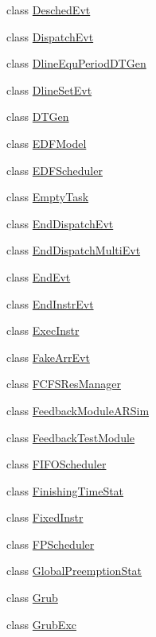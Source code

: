 \begin{DoxyCompactItemize}
class \hyperlink{classRTSim_1_1DeschedEvt}{Desched\+Evt}
\item 
class \hyperlink{classRTSim_1_1DispatchEvt}{Dispatch\+Evt}
\item 
class \hyperlink{classRTSim_1_1DlineEquPeriodDTGen}{Dline\+Equ\+Period\+D\+T\+Gen}
\item 
class \hyperlink{classRTSim_1_1DlineSetEvt}{Dline\+Set\+Evt}
\item 
class \hyperlink{classRTSim_1_1DTGen}{D\+T\+Gen}
\item 
class \hyperlink{classRTSim_1_1EDFModel}{E\+D\+F\+Model}
\item 
class \hyperlink{classRTSim_1_1EDFScheduler}{E\+D\+F\+Scheduler}
\item 
class \hyperlink{classRTSim_1_1EmptyTask}{Empty\+Task}
\item 
class \hyperlink{classRTSim_1_1EndDispatchEvt}{End\+Dispatch\+Evt}
\item 
class \hyperlink{classRTSim_1_1EndDispatchMultiEvt}{End\+Dispatch\+Multi\+Evt}
\item 
class \hyperlink{classRTSim_1_1EndEvt}{End\+Evt}
\item 
class \hyperlink{classRTSim_1_1EndInstrEvt}{End\+Instr\+Evt}
\item 
class \hyperlink{classRTSim_1_1ExecInstr}{Exec\+Instr}
\item 
class \hyperlink{classRTSim_1_1FakeArrEvt}{Fake\+Arr\+Evt}
\item 
class \hyperlink{classRTSim_1_1FCFSResManager}{F\+C\+F\+S\+Res\+Manager}
\item 
class \hyperlink{classRTSim_1_1FeedbackModuleARSim}{Feedback\+Module\+A\+R\+Sim}
\item 
class \hyperlink{classRTSim_1_1FeedbackTestModule}{Feedback\+Test\+Module}
\item 
class \hyperlink{classRTSim_1_1FIFOScheduler}{F\+I\+F\+O\+Scheduler}
\item 
class \hyperlink{classRTSim_1_1FinishingTimeStat}{Finishing\+Time\+Stat}
\item 
class \hyperlink{classRTSim_1_1FixedInstr}{Fixed\+Instr}
\item 
class \hyperlink{classRTSim_1_1FPScheduler}{F\+P\+Scheduler}
\item 
class \hyperlink{classRTSim_1_1GlobalPreemptionStat}{Global\+Preemption\+Stat}
\item 
class \hyperlink{classRTSim_1_1Grub}{Grub}
\item 
class \hyperlink{classRTSim_1_1GrubExc}{Grub\+Exc}
\item 

\end{DoxyCompactItemize}
